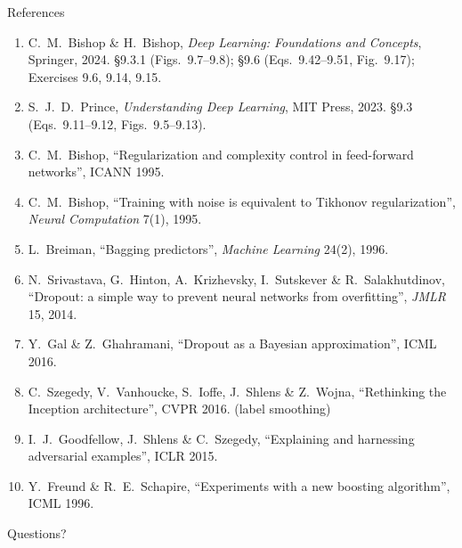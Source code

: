 \documentclass[aspectratio=169, 11pt]{beamer}
\newcommand{\nosrc}{}       %
\begin{document}
\begin{frame}[allowframebreaks]{References}
  \nosrc
  \vspace{0.3em}
  {\scriptsize
  \begin{enumerate}\itemsep0.30em
    \item C.\ M.\ Bishop \& H.\ Bishop, \emph{Deep Learning: Foundations
          and Concepts}, Springer, 2024. \S9.3.1 (Figs.~9.7--9.8);
          \S9.6 (Eqs.~9.42--9.51, Fig.~9.17); Exercises 9.6, 9.14, 9.15.
    \item S.\ J.\ D.\ Prince, \emph{Understanding Deep Learning}, MIT
          Press, 2023. \S9.3 (Eqs.~9.11--9.12, Figs.~9.5--9.13).
    \item C.\ M.\ Bishop, ``Regularization and complexity control in
          feed-forward networks'', ICANN 1995.
    \item C.\ M.\ Bishop, ``Training with noise is equivalent to
          Tikhonov regularization'', \emph{Neural Computation} 7(1),
          1995.
    \item L.\ Breiman, ``Bagging predictors'', \emph{Machine Learning}
          24(2), 1996.
    \item N.\ Srivastava, G.\ Hinton, A.\ Krizhevsky, I.\ Sutskever \&
          R.\ Salakhutdinov, ``Dropout: a simple way to prevent neural
          networks from overfitting'', \emph{JMLR} 15, 2014.
    \item Y.\ Gal \& Z.\ Ghahramani, ``Dropout as a Bayesian
          approximation'', ICML 2016.
    \item C.\ Szegedy, V.\ Vanhoucke, S.\ Ioffe, J.\ Shlens \&
          Z.\ Wojna, ``Rethinking the Inception architecture'',
          CVPR 2016. (label smoothing)
    \item I.\ J.\ Goodfellow, J.\ Shlens \& C.\ Szegedy, ``Explaining
          and harnessing adversarial examples'', ICLR 2015.
    \item Y.\ Freund \& R.\ E.\ Schapire, ``Experiments with a new
          boosting algorithm'', ICML 1996.
  \end{enumerate}}
\end{frame}

\begin{frame}[standout]
  \nosrc
  Questions?
\end{frame}
\end{document}
